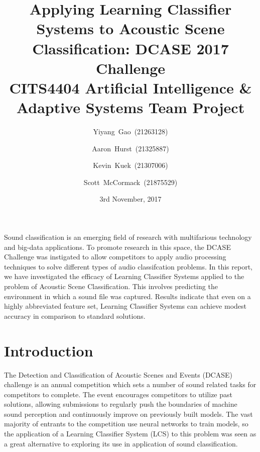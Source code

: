 \documentclass[11pt]{article}
\renewenvironment{abstract}
{\small
	\begin{center}
		\bfseries \abstractname\vspace{-.5em}\vspace{0pt}
	\end{center}
	\list{}{
		\setlength{\leftmargin}{.5cm}%
		\setlength{\rightmargin}{\leftmargin}%
	}%
	\item\relax}
{\endlist}
\begin{document}
\title{
	Applying Learning Classifier Systems to Acoustic Scene Classification: DCASE 2017 Challenge \\
	\vspace{0.2in}
	\large CITS4404 Artificial Intelligence \& Adaptive Systems Team Project
}
\author{Yiyang~Gao~(21263128)}
\author{Aaron~Hurst~(21325887)}
\author{Kevin~Kuek~(21307006)}
\author{Scott~McCormack~(21875529)}

\date{3rd November, 2017}

\maketitle

\begin{abstract}
	Sound classification is an emerging field of research with multifarious technology and big-data applications. To promote research in this space, the DCASE Challenge was instigated to allow competitors to apply audio processing techniques to solve different types of audio classifcation problems. In this report, we have investigated the efficacy of Learning Classifier Systems applied to the problem of Acoustic Scene Classification. This involves predicting the environment in which a sound file was captured. Results indicate that even on a highly abbreviated feature set, Learning Classifier Systems can achieve modest accuracy in comparison to standard solutions.
\end{abstract}


\section{Introduction}

The Detection and Classification of Acoustic Scenes and Events (DCASE) challenge is an annual competition which sets a number of sound related tasks for competitors to complete. The event encourages competitors to utilize past solutions, allowing submissions to regularly push the boundaries of machine sound perception and continuously improve on previously built models. The vast majority of entrants to the competition use neural networks to train models, so the application of a Learning Classifier System (LCS) to this problem was seen as a great alternative to exploring its use in application of sound classification.
\end{document}
